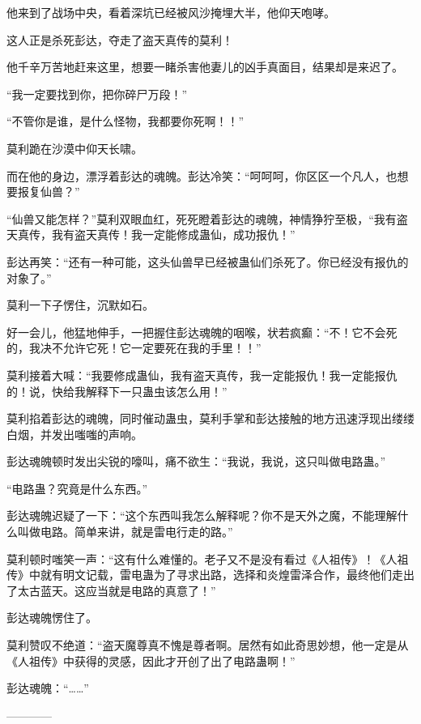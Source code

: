\begin{this_body}
他来到了战场中央，看着深坑已经被风沙掩埋大半，他仰天咆哮。

这人正是杀死彭达，夺走了盗天真传的莫利！

他千辛万苦地赶来这里，想要一睹杀害他妻儿的凶手真面目，结果却是来迟了。

“我一定要找到你，把你碎尸万段！”

“不管你是谁，是什么怪物，我都要你死啊！！”

莫利跪在沙漠中仰天长啸。

而在他的身边，漂浮着彭达的魂魄。彭达冷笑：“呵呵呵，你区区一个凡人，也想要报复仙兽？”

“仙兽又能怎样？”莫利双眼血红，死死瞪着彭达的魂魄，神情狰狞至极，“我有盗天真传，我有盗天真传！我一定能修成蛊仙，成功报仇！”

彭达再笑：“还有一种可能，这头仙兽早已经被蛊仙们杀死了。你已经没有报仇的对象了。”

莫利一下子愣住，沉默如石。

好一会儿，他猛地伸手，一把握住彭达魂魄的咽喉，状若疯癫：“不！它不会死的，我决不允许它死！它一定要死在我的手里！！”

莫利接着大喊：“我要修成蛊仙，我有盗天真传，我一定能报仇！我一定能报仇的！说，快给我解释下一只蛊虫该怎么用！”

莫利掐着彭达的魂魄，同时催动蛊虫，莫利手掌和彭达接触的地方迅速浮现出缕缕白烟，并发出嗤嗤的声响。

彭达魂魄顿时发出尖锐的嚎叫，痛不欲生：“我说，我说，这只叫做电路蛊。”

“电路蛊？究竟是什么东西。”

彭达魂魄迟疑了一下：“这个东西叫我怎么解释呢？你不是天外之魔，不能理解什么叫做电路。简单来讲，就是雷电行走的路。”

莫利顿时嗤笑一声：“这有什么难懂的。老子又不是没有看过《人祖传》！《人祖传》中就有明文记载，雷电蛊为了寻求出路，选择和炎煌雷泽合作，最终他们走出了太古蓝天。这应当就是电路的真意了！”

彭达魂魄愣住了。

莫利赞叹不绝道：“盗天魔尊真不愧是尊者啊。居然有如此奇思妙想，他一定是从《人祖传》中获得的灵感，因此才开创了出了电路蛊啊！”

彭达魂魄：“……”

------------

\end{this_body}

